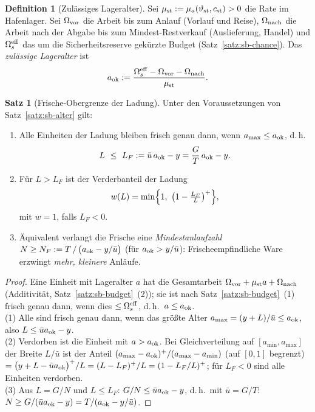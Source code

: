 \documentclass[a4paper, 12pt, twoside, openright]{report}
\theoremstyle{definition}
\newtheorem{definition}[theorem]{Definition}
\theoremstyle{definition}
\newtheorem{satz}{Satz}[chapter]
\begin{document}
\begin{definition}[Zulässiges Lageralter]\label{def:sb-aok}
Sei $\mu_{\rm st}:=\mu_a(\vartheta_{\rm st},c_{\rm st})>0$ die Rate im Hafenlager. Sei
$\Omega_{\rm vor}$ die Arbeit bis zum Anlauf (Vorlauf und Reise), $\Omega_{\rm nach}$ die
Arbeit nach der Abgabe bis zum Mindest-Restverkauf (Auslieferung, Handel) und
$\Omega_s^{\rm eff}$ das um die Sicherheitsreserve gekürzte Budget
(Satz~\ref{satz:sb-chance}). Das \emph{zulässige Lageralter} ist
\begin{equation}
  a_{\rm ok}:=\frac{\Omega_s^{\rm eff}-\Omega_{\rm vor}-\Omega_{\rm nach}}{\mu_{\rm st}}.
  \label{eq:sb-aok}
\end{equation}
\end{definition}

\begin{satz}[Frische-Obergrenze der Ladung]\label{satz:sb-LF}
Unter den Voraussetzungen von Satz~\ref{satz:sb-alter} gilt:
\begin{enumerate}
  \item Alle Einheiten der Ladung bleiben frisch genau dann, wenn $a_{\max}\le a_{\rm ok}$, d.\,h.
    \begin{equation}
      L\ \le\ L_F:=\bar u\,a_{\rm ok}-y=\frac{G}{T}\,a_{\rm ok}-y .
      \label{eq:sb-LF}
    \end{equation}
  \item Für $L>L_F$ ist der Verderbanteil der Ladung
    \begin{equation}
      w(L)=\min\Bigl\{1,\ \bigl(1-\tfrac{L_F}{L}\bigr)^{+}\Bigr\},
      \label{eq:sb-w}
    \end{equation}
    mit $w=1$, falls $L_F<0$.
  \item Äquivalent verlangt die Frische eine \emph{Mindestanlaufzahl}
    $N\ge N_F:=T\,/\,\bigl(a_{\rm ok}-y/\bar u\bigr)$ (für $a_{\rm ok}>y/\bar u$): Frischeempfindliche Ware
    erzwingt \emph{mehr, kleinere} Anläufe.
\end{enumerate}
\end{satz}

\begin{proof}
Eine Einheit mit Lageralter $a$ hat die Gesamtarbeit
$\Omega_{\rm vor}+\mu_{\rm st}a+\Omega_{\rm nach}$ (Additivität, Satz~\ref{satz:sb-budget}~(2)); sie
ist nach Satz~\ref{satz:sb-budget}~(1) frisch genau dann, wenn dies $\le\Omega_s^{\rm eff}$,
d.\,h.\ $a\le a_{\rm ok}$.\\
(1) Alle sind frisch genau dann, wenn das größte Alter $a_{\max}=(y+L)/\bar u\le a_{\rm ok}$,
also $L\le\bar ua_{\rm ok}-y$.\\
(2) Verdorben ist die Einheit mit $a>a_{\rm ok}$. Bei Gleichverteilung auf
$[a_{\min},a_{\max}]$ der Breite $L/\bar u$ ist der Anteil
$(a_{\max}-a_{\rm ok})^+/(a_{\max}-a_{\min})$ (auf $[0,1]$ begrenzt) $=\bigl(y+L-\bar ua_{\rm ok}\bigr)^+/L
=(L-L_F)^+/L=(1-L_F/L)^+$; für $L_F<0$ sind alle Einheiten verdorben.\\
(3) Aus $L=G/N$ und $L\le L_F$: $G/N\le\bar ua_{\rm ok}-y$, d.\,h.\ mit $\bar u=G/T$:
$N\ge G/(\bar ua_{\rm ok}-y)=T/(a_{\rm ok}-y/\bar u)$.
\end{proof}
\end{document}
